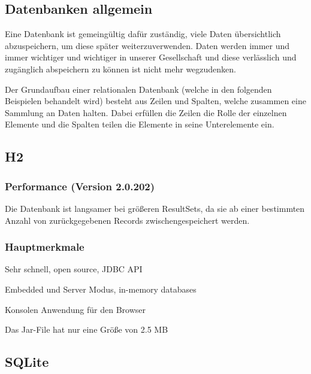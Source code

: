\subsection{Datenbanken allgemein}
Eine Datenbank ist gemeingültig dafür zuständig, viele Daten übersichtlich abzuspeichern, um diese später weiterzuverwenden. Daten werden immer und immer wichtiger und wichtiger in unserer Gesellschaft und diese verlässlich und zugänglich abspeichern zu können ist nicht mehr wegzudenken.
 
Der Grundaufbau einer relationalen Datenbank (welche in den folgenden Beispielen behandelt wird) besteht aus Zeilen und Spalten, welche zusammen eine Sammlung an Daten halten. Dabei erfüllen die Zeilen die Rolle der einzelnen Elemente und die Spalten teilen die Elemente in seine Unterelemente ein.
 
 
\subsection{H2}
 
\subsubsection{Performance (Version 2.0.202)}
Die Datenbank ist langsamer bei größeren ResultSets, da sie ab einer bestimmten Anzahl von zurückgegebenen Records zwischengespeichert werden.
 
\subsubsection{Hauptmerkmale}
 
\begin{compactitem}
    \item Sehr schnell, open source, JDBC API
    \item Embedded und Server Modus, in-memory databases        
    \item Konsolen Anwendung für den Browser
    \item Das Jar-File hat nur eine Größe von 2.5 MB
\end{compactitem}
 
\subsection{SQLite}
 
